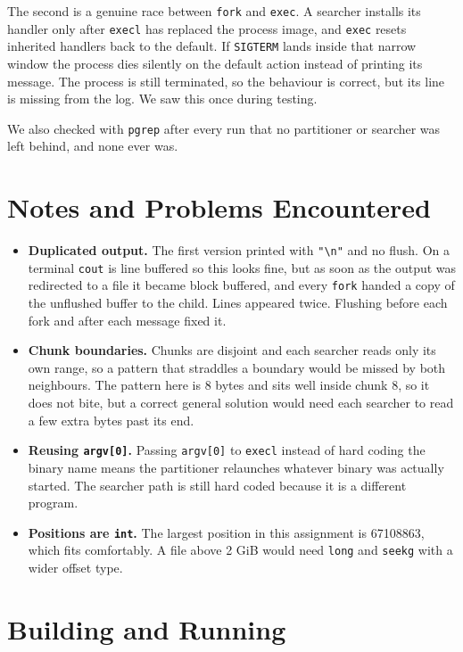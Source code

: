 \documentclass[11pt]{article}
\begin{document}
The second is a genuine race between \texttt{fork} and \texttt{exec}. A searcher
installs its handler only after \texttt{execl} has replaced the process image, and
\texttt{exec} resets inherited handlers back to the default. If \texttt{SIGTERM}
lands inside that narrow window the process dies silently on the default action
instead of printing its message. The process is still terminated, so the behaviour
is correct, but its line is missing from the log. We saw this once during testing.

We also checked with \texttt{pgrep} after every run that no partitioner or searcher
was left behind, and none ever was.

\section*{Notes and Problems Encountered}

\begin{itemize}
	\item \textbf{Duplicated output.} The first version printed with
	\texttt{"{\textbackslash}n"}
	and no flush. On a terminal \texttt{cout} is line buffered so this looks fine,
	but as soon as the output was redirected to a file it became block buffered, and
	every \texttt{fork} handed a copy of the unflushed buffer to the child. Lines
	appeared twice. Flushing before each fork and after each message fixed it.
	\item \textbf{Chunk boundaries.} Chunks are disjoint and each searcher reads only
	its own range, so a pattern that straddles a boundary would be missed by both
	neighbours. The pattern here is 8 bytes and sits well inside chunk 8, so it does
	not bite, but a correct general solution would need each searcher to read a few
	extra bytes past its end.
	\item \textbf{Reusing \texttt{argv[0]}.} Passing \texttt{argv[0]} to
	\texttt{execl} instead of hard coding the binary name means the partitioner
	relaunches whatever binary was actually started. The searcher path is still hard
	coded because it is a different program.
	\item \textbf{Positions are \texttt{int}.} The largest position in this
	assignment is 67108863, which fits comfortably. A file above 2 GiB would need
	\texttt{long} and \texttt{seekg} with a wider offset type.
\end{itemize}

\section*{Building and Running}
\end{document}
